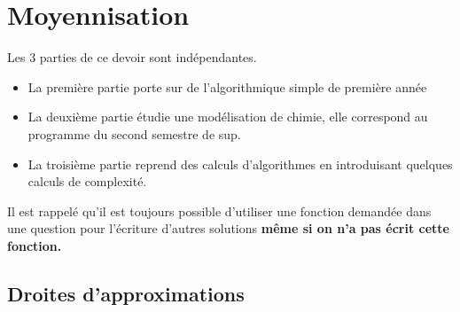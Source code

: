 \chapter{Moyennisation}

Les 3 parties de ce devoir sont indépendantes.
\begin{itemize}
    \item La première partie porte sur de l'algorithmique simple de première année
    \item La deuxième partie étudie une modélisation de chimie, elle correspond au programme du second semestre de sup.
    \item La troisième partie reprend des calculs d'algorithmes en introduisant quelques calculs de complexité.
\end{itemize}

\medskip

Il est rappelé qu'il est toujours possible d'utiliser une fonction demandée dans une question pour l'écriture d'autres solutions {\bf même si on n'a pas écrit cette fonction.}

\section{Droites d'approximations} 
